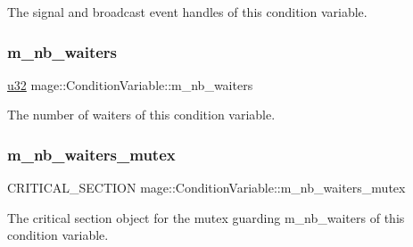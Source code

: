 The signal and broadcast event handles of this condition variable. \hypertarget{structmage_1_1_condition_variable_a3e707192c1372a21659df405867048eb}{}\label{structmage_1_1_condition_variable_a3e707192c1372a21659df405867048eb} 
\subsubsection{\texorpdfstring{m\+\_\+nb\+\_\+waiters}{m\_nb\_waiters}}
{\footnotesize\ttfamily \hyperlink{namespacemage_af2b398bf98eb10351f49cad73fe2cc73}{u32} mage\+::\+Condition\+Variable\+::m\+\_\+nb\+\_\+waiters\hspace{0.3cm}{\ttfamily [private]}}

The number of waiters of this condition variable. \hypertarget{structmage_1_1_condition_variable_a0686e682d62d44ff1eb9ac45acbb0eab}{}\label{structmage_1_1_condition_variable_a0686e682d62d44ff1eb9ac45acbb0eab} 
\subsubsection{\texorpdfstring{m\+\_\+nb\+\_\+waiters\+\_\+mutex}{m\_nb\_waiters\_mutex}}
{\footnotesize\ttfamily C\+R\+I\+T\+I\+C\+A\+L\+\_\+\+S\+E\+C\+T\+I\+ON mage\+::\+Condition\+Variable\+::m\+\_\+nb\+\_\+waiters\+\_\+mutex\hspace{0.3cm}{\ttfamily [private]}}

The critical section object for the mutex guarding {\ttfamily m\+\_\+nb\+\_\+waiters} of this condition variable. 